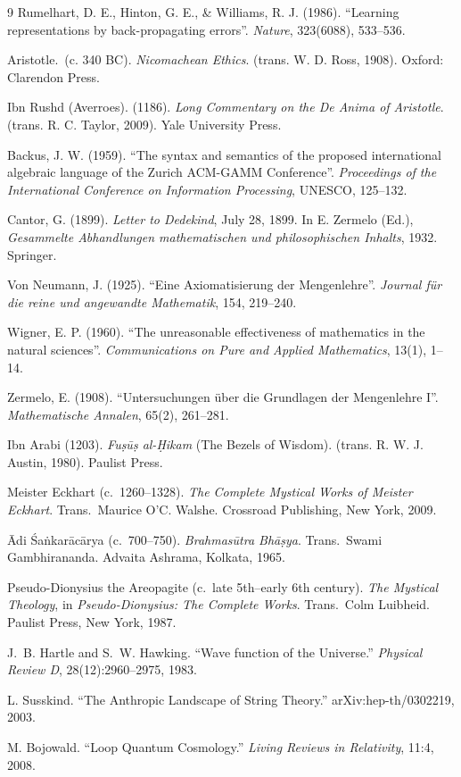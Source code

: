\documentclass[11pt, a4paper]{article}
\theoremstyle{formalism}
\begin{document}
\begin{thebibliography}{9}
Rumelhart, D. E., Hinton, G. E., \& Williams, R. J. (1986). 
``Learning representations by back-propagating errors''. 
\textit{Nature}, 323(6088), 533--536.

Aristotle.\ (c. 340 BC). 
\textit{Nicomachean Ethics}. 
(trans. W. D. Ross, 1908). Oxford: Clarendon Press.

Ibn Rushd (Averroes). (1186). 
\textit{Long Commentary on the De Anima of Aristotle}. 
(trans. R. C. Taylor, 2009). Yale University Press.

Backus, J. W. (1959). 
``The syntax and semantics of the proposed international algebraic language of the Zurich ACM-GAMM Conference''. 
\textit{Proceedings of the International Conference on Information Processing}, UNESCO, 125--132.

Cantor, G. (1899). 
\textit{Letter to Dedekind}, July 28, 1899. 
In E. Zermelo (Ed.), \textit{Gesammelte Abhandlungen mathematischen und philosophischen Inhalts}, 1932. Springer.

Von Neumann, J. (1925). 
``Eine Axiomatisierung der Mengenlehre''. 
\textit{Journal f{\"u}r die reine und angewandte Mathematik}, 154, 219--240.

Wigner, E. P. (1960). 
``The unreasonable effectiveness of mathematics in the natural sciences''. 
\textit{Communications on Pure and Applied Mathematics}, 13(1), 1--14.

Zermelo, E. (1908). 
``Untersuchungen {\"u}ber die Grundlagen der Mengenlehre I''. 
\textit{Mathematische Annalen}, 65(2), 261--281.

Ibn Arabi (1203).
\textit{Fu\d{s}\=u\d{s} al-\d{H}ikam} (The Bezels of Wisdom).
(trans. R. W. J. Austin, 1980). Paulist Press.

Meister Eckhart (c.~1260--1328).
\textit{The Complete Mystical Works of Meister Eckhart}.
Trans.\ Maurice O'C. Walshe.
Crossroad Publishing, New York, 2009.

\=Adi \'Sa\.{n}kar\=ac\=arya (c.~700--750).
\textit{Brahmas\=utra Bh\=a\d{s}ya}.
Trans.\ Swami Gambhirananda.
Advaita Ashrama, Kolkata, 1965.

Pseudo-Dionysius the Areopagite (c.\ late 5th--early 6th century).
\textit{The Mystical Theology}, in \textit{Pseudo-Dionysius: The Complete
Works}.
Trans.\ Colm Luibheid.
Paulist Press, New York, 1987.

J.~B. Hartle and S.~W. Hawking.
``Wave function of the Universe.''
\textit{Physical Review D}, 28(12):2960--2975, 1983.

L. Susskind.
``The Anthropic Landscape of String Theory.''
arXiv:hep-th/0302219, 2003.

M. Bojowald.
``Loop Quantum Cosmology.''
\textit{Living Reviews in Relativity}, 11:4, 2008.

\end{thebibliography}
\end{document}
